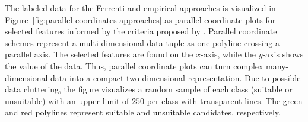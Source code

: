 \documentclass[superscriptaddress,
preprint,
 amsmath,amssymb,
 aps,
]{revtex4-2}
\begin{document}
The labeled data for the Ferrenti and empirical approaches is visualized in Figure~\ref{fig:parallel-coordinates-approaches} as parallel coordinate plots for selected features informed by the criteria proposed by \citeauthor{Weber2010} \cite{Weber2010}. Parallel coordinate schemes \cite{Inselberga1990, Inselberg1985} represent a multi-dimensional data tuple as one polyline crossing a parallel axis. The selected features are found on the $x$-axis, while the $y$-axis shows the value of the data. Thus, parallel coordinate plots can turn complex many-dimensional data into a compact  two-dimensional representation. Due to possible data cluttering, the figure visualizes a random sample of each class (suitable or unsuitable) with an upper limit of $250$ per class with transparent lines. The green and red polylines represent suitable and unsuitable candidates, respectively. 
\end{document}
